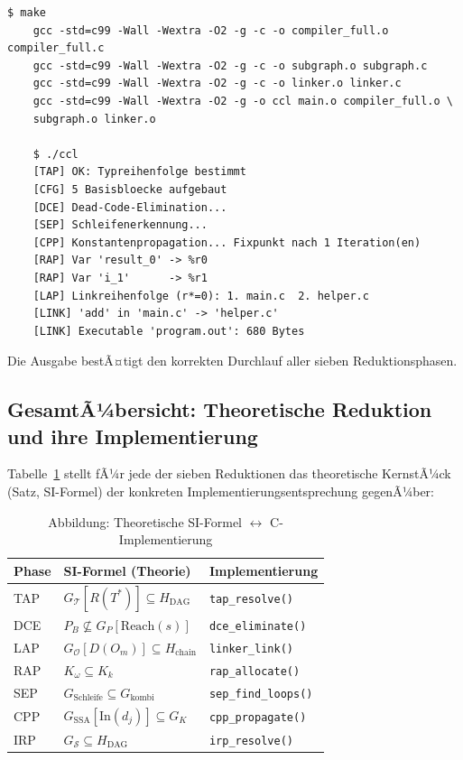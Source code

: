 ﻿\documentclass[a4paper,12pt]{article}
\theoremstyle{definition}
\begin{document}
\begin{lstlisting}[style=bashstyle, caption={Build und AusfÃ¼hrung},
	label=lst:build]
	$ make
	gcc -std=c99 -Wall -Wextra -O2 -g -c -o compiler_full.o compiler_full.c
	gcc -std=c99 -Wall -Wextra -O2 -g -c -o subgraph.o subgraph.c
	gcc -std=c99 -Wall -Wextra -O2 -g -c -o linker.o linker.c
	gcc -std=c99 -Wall -Wextra -O2 -g -o ccl main.o compiler_full.o \
	subgraph.o linker.o
	
	$ ./ccl
	[TAP] OK: Typreihenfolge bestimmt
	[CFG] 5 Basisbloecke aufgebaut
	[DCE] Dead-Code-Elimination...
	[SEP] Schleifenerkennung...
	[CPP] Konstantenpropagation... Fixpunkt nach 1 Iteration(en)
	[RAP] Var 'result_0' -> %r0
	[RAP] Var 'i_1'      -> %r1
	[LAP] Linkreihenfolge (r*=0): 1. main.c  2. helper.c
	[LINK] 'add' in 'main.c' -> 'helper.c'
	[LINK] Executable 'program.out': 680 Bytes
\end{lstlisting}

Die Ausgabe bestÃ¤tigt den korrekten Durchlauf aller sieben Reduktionsphasen.

\subsection{GesamtÃ¼bersicht: Theoretische Reduktion und ihre Implementierung}

Tabelle~\ref{tab:impl-uebersicht} stellt fÃ¼r jede der sieben Reduktionen
das theoretische KernstÃ¼ck (Satz, SI-Formel) der konkreten
Implementierungsentsprechung gegenÃ¼ber:

\begin{table}[h!]
	\centering
	\renewcommand{\arraystretch}{1.5}
	\begin{tabular}{|l|l|l|}
		\hline
		\textbf{Phase} & \textbf{SI-Formel (Theorie)} & \textbf{Implementierung} \\
		\hline
		TAP &
		$G_{\mathcal{T}}[R(T^*)] \subseteq H_{\text{DAG}}$ &
		\texttt{tap\_resolve()} \\
		DCE &
		$P_B \not\subseteq G_P[\mathrm{Reach}(s)]$ &
		\texttt{dce\_eliminate()} \\
		LAP &
		$G_{\mathcal{O}}[D(O_m)] \subseteq H_{\text{chain}}$ &
		\texttt{linker\_link()} \\
		RAP &
		$K_\omega \subseteq K_k$ &
		\texttt{rap\_allocate()} \\
		SEP &
		$G_{\text{Schleife}} \subseteq G_{\text{kombi}}$ &
		\texttt{sep\_find\_loops()} \\
		CPP &
		$G_{\text{SSA}}[\mathrm{In}(d_j)] \subseteq G_K$ &
		\texttt{cpp\_propagate()} \\
		IRP &
		$G_{\mathcal{S}} \subseteq H_{\text{DAG}}$ &
		\texttt{irp\_resolve()} \\
		\hline
	\end{tabular}
	\caption{Abbildung: Theoretische SI-Formel $\leftrightarrow$ C-Implementierung}
	\label{tab:impl-uebersicht}
\end{table}
\end{document}
